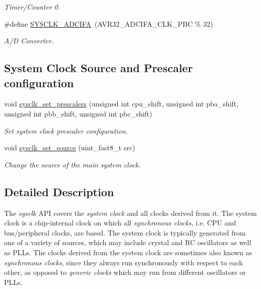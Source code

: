 \begin{DoxyCompactItemize}
\begin{DoxyCompactList}\small\item\em \-Timer/\-Counter 0. \end{DoxyCompactList}\item 
\#define \hyperlink{group__sysclk__group_ga6e40fd22e30fe8f7553443d88ee817aa}{\-S\-Y\-S\-C\-L\-K\-\_\-\-A\-D\-C\-I\-F\-A}~(\-A\-V\-R32\-\_\-\-A\-D\-C\-I\-F\-A\-\_\-\-C\-L\-K\-\_\-\-P\-B\-C \% 32)
\begin{DoxyCompactList}\small\item\em \-A/\-D \-Converter. \end{DoxyCompactList}\end{DoxyCompactItemize}
\subsection*{\-System \-Clock \-Source and \-Prescaler configuration}
\begin{DoxyCompactItemize}
\item 
void \hyperlink{group__sysclk__group_ga9e93d93c137135fee8a1a7102367042e}{sysclk\-\_\-set\-\_\-prescalers} (unsigned int cpu\-\_\-shift, unsigned int pba\-\_\-shift, unsigned int pbb\-\_\-shift, unsigned int pbc\-\_\-shift)
\begin{DoxyCompactList}\small\item\em \-Set system clock prescaler configuration. \end{DoxyCompactList}\item 
void \hyperlink{group__sysclk__group_ga222a121dfaac21b0c0af9d4dcb39496c}{sysclk\-\_\-set\-\_\-source} (uint\-\_\-fast8\-\_\-t src)
\begin{DoxyCompactList}\small\item\em \-Change the source of the main system clock. \end{DoxyCompactList}\end{DoxyCompactItemize}


\subsection{\-Detailed \-Description}
\-The {\itshape sysclk\/} \-A\-P\-I covers the {\itshape system clock\/} and all clocks derived from it. \-The system clock is a chip-\/internal clock on which all {\itshape synchronous clocks\/}, i.\-e. \-C\-P\-U and bus/peripheral clocks, are based. \-The system clock is typically generated from one of a variety of sources, which may include crystal and \-R\-C oscillators as well as \-P\-L\-Ls. \-The clocks derived from the system clock are sometimes also known as {\itshape synchronous clocks\/}, since they always run synchronously with respect to each other, as opposed to {\itshape generic clocks\/} which may run from different oscillators or \-P\-L\-Ls.

